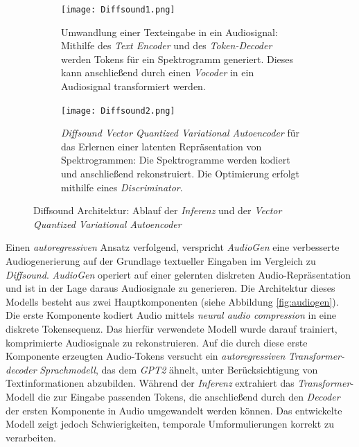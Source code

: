 \documentclass[
  a4paper,  %
  twoside,  %
  bibliography=totoc,
  headsepline,
  cleardoublepage=empty,
  parskip=half,
  draft=false
]{scrbook}
\begin{document}
\begin{figure}[h]
\centering
\begin{subfigure}{1.0\textwidth}
  \centering
  \texttt{[image: Diffsound1.png]}
  \caption[Diffsound Architektur]{Umwandlung einer Texteingabe in ein Audiosignal: Mithilfe des \emph{Text Encoder} und des \emph{Token-Decoder} werden Tokens für ein Spektrogramm generiert. Dieses kann anschließend durch einen \emph{Vocoder} in ein Audiosignal transformiert werden. \cite{yang_diffsound_2023}
}
  \label{fig:DiffsoundArchitecture}
\end{subfigure}

\vspace{1em} %

\begin{subfigure}{1.0\textwidth}
  \centering
  \texttt{[image: Diffsound2.png]}
  \caption[Diffsound VQ-VAE]{\emph{Diffsound Vector Quantized Variational Autoencoder} für das Erlernen einer latenten Repräsentation von Spektrogrammen: Die Spektrogramme werden kodiert und anschließend rekonstruiert. Die Optimierung erfolgt mithilfe eines \emph{Discriminator}. \cite{yang_diffsound_2023}}
  \label{fig:VQVAE}
\end{subfigure}
\caption[Diffsound Architektur]{Diffsound Architektur: Ablauf der \emph{Inferenz} und der \emph{Vector Quantized Variational Autoencoder} \cite{yang_diffsound_2023}}
\label{fig:test}
\end{figure}

Einen \emph{autoregressiven} Ansatz verfolgend, verspricht \emph{AudioGen} \cite{kreuk_audiogen_2023} eine verbesserte Audiogenerierung auf der Grundlage textueller Eingaben im Vergleich zu \emph{Diffsound}. \emph{AudioGen} operiert auf einer gelernten diskreten Audio-Repräsentation und ist in der Lage daraus Audiosignale zu generieren. Die Architektur dieses Modells besteht aus zwei Hauptkomponenten (siehe Abbildung \ref{fig:audiogen}). Die erste Komponente kodiert Audio mittels \emph{neural audio compression} \cite{zeghidour_soundstream_2021} in eine diskrete Tokensequenz. Das hierfür verwendete Modell wurde darauf trainiert, komprimierte Audiosignale zu rekonstruieren. Auf die durch diese erste Komponente erzeugten Audio-Tokens versucht ein \emph{autoregressiven} \emph{Transformer-decoder} \emph{Sprachmodell}, das dem \emph{GPT2} \cite{alec_radford_jeff_wu_rewon_child_david_luan_dario_amodei_ilya_sutskever_language_2019} ähnelt, unter Berücksichtigung von Textinformationen abzubilden. Während der \emph{Inferenz} extrahiert das \emph{Transformer}-Modell die zur Eingabe passenden Tokens, die anschließend durch den \emph{Decoder} der ersten Komponente in Audio umgewandelt werden können. Das entwickelte Modell zeigt jedoch Schwierigkeiten, temporale Umformulierungen korrekt zu verarbeiten. \cite{kreuk_audiogen_2023}
\end{document}

